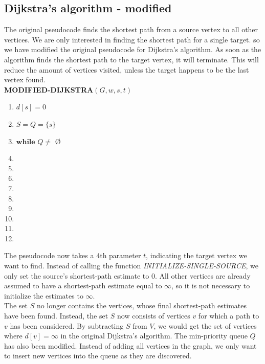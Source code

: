 \documentclass[11pt]{article}
\begin{document}
\subsection{Dijkstra's algorithm - modified}
\noindent The original pseudocode finds the shortest path from a source vertex to all other vertices. We are only interested in finding the shortest path for a single target. so we have modified the original pseudocode for Dijkstra's algorithm. As soon as the algorithm finds the shortest path to the target vertex, it will terminate. This will reduce the amount of vertices visited, unless the target happens to be the last vertex found.\\

\textbf{MODIFIED-DIJKSTRA$(G, w, s, t)$}
\begin{enumerate}
\setlength\itemsep{0em}
\item $d[s] = 0$
\item $S = Q = \{s\}$
\item $\textbf{while } Q \neq  $ \O
\item {}
\item {}
\item \tab{}
\item {}
\item \tab{}
\item \tab{}\tab{}
\item \tab{}\tab{}
\item \tab{}\tab{}
\item \tab{}\tab{}
\end{enumerate}

\noindent The pseudocode now takes a 4th parameter $t$, indicating the target vertex we want to find. Instead of calling the function \textit{INITIALIZE-SINGLE-SOURCE}, we only set the source's shortest-path estimate to 0. All other vertices are already assumed to have a shortest-path estimate equal to $\infty$, so it is not necessary to initialize the estimates to $\infty$.\\

\noindent The set $S$ no longer contains the vertices, whose final shortest-path estimates have been found. Instead, the set $S$ now consists of vertices $v$ for which a path to $v$ has been considered. By subtracting $S$ from $V$, we would get the set of vertices where $d[v]=\infty$ in the original Dijkstra's algorithm. The min-priority queue $Q$ has also been modified. Instead of adding all vertices in the graph, we only want to insert new vertices into the queue as they are discovered.\\ 
\end{document}
